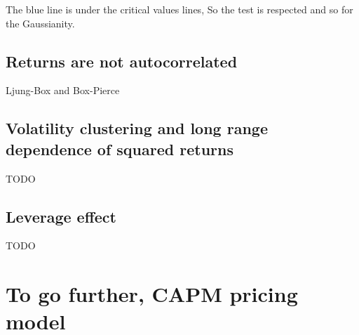 \documentclass{article}
\begin{document}
\noindent The blue line is under the critical values lines, 
So the test is respected and so for the Gaussianity.
\subsection{Returns are not autocorrelated}
\begin{table}[h!]
    \centering
      
    \caption{Ljung-Box and Box-Pierce}
    \label{tab:LB_BP}
\end{table}
\subsection{Volatility clustering and long range dependence of squared returns}
TODO
\subsection{Leverage effect}
TODO

\appendix



\section{To go further, CAPM pricing model}


\end{document}
